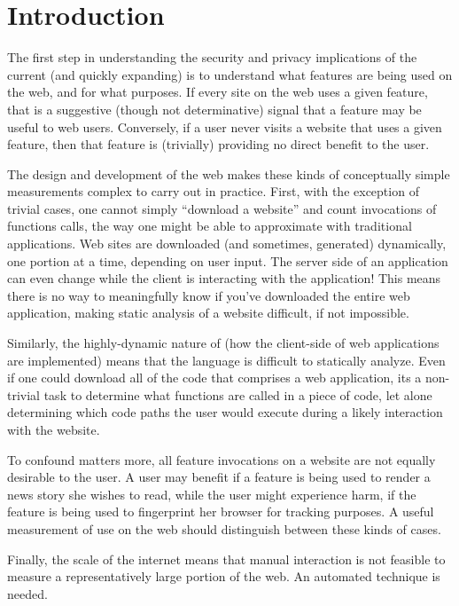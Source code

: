 \section{Introduction}
\label{measurement:overview}

The first step in understanding the security and privacy implications
of the current (and quickly expanding) \WAPI is to understand what features
are being used on the web, and for what purposes.  If every site on the
web uses a given \WAPI feature, that is a suggestive (though not determinative)
signal that a feature may be useful to web users.  Conversely, if a user
never visits a website that uses a given \WAPI feature, then that feature
is (trivially) providing no direct benefit to the user.

The design and development of the web makes these kinds of conceptually simple
measurements complex to carry out in practice.  First, with the exception of
trivial cases, one cannot simply ``download a website'' and count invocations
of functions calls, the way one might be able to approximate with traditional
applications.  Web sites are downloaded (and sometimes, generated) dynamically,
one portion at a time, depending on user input. The server side of an
application can even change while the client is interacting with the
application!  This means there is no way to meaningfully know if
you've downloaded the entire web application, making static analysis of a
website difficult, if not impossible.

Similarly, the highly-dynamic nature of \JS (how the client-side of web
applications are implemented) means that the language is difficult to
statically analyze. Even if one could download all of the \JS code that
comprises a web application, its a non-trivial task to determine what \WAPI
functions are called in a piece of code, let alone determining which code paths
the user would execute during a likely interaction with the website.

To confound matters more, all feature invocations on a website are not equally
desirable to the user.  A user may benefit if a feature is being used to render
a news story she wishes to read, while the user might experience harm, if the
feature is being used to fingerprint her browser for tracking purposes.  A
useful measurement of \WAPI use on the web should distinguish between these
kinds of cases.

Finally, the scale of the internet means that manual interaction is not
feasible to measure a representatively large portion of the web.  An automated
technique is needed.

